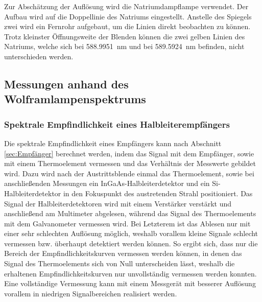 \documentclass[a4paper,twoside,final]{article}
\begin{document}


Zur Abschätzung der Auflösung wird die Natriumdampflampe verwendet. Der Aufbau wird auf die Doppellinie des Natriums eingestellt. Anstelle des Spiegels zwei wird ein Fernrohr aufgebaut, um die Linien direkt beobachten zu können. Trotz kleinster Öffnungsweite der Blenden können die zwei gelben Linien des Natriums, welche sich bei \SI{588.9951}{\nano\meter} und bei \SI{589.5924}{\nano\meter} befinden, nicht unterschieden werden.

\subsection{Messungen anhand des Wolframlampenspektrums}
\subsubsection{Spektrale Empfindlichkeit eines Halbleiterempfängers}
Die spektrale Empfindlichkeit eines Empfängers kann nach Abschnitt \ref{sec:Empfänger} berechnet werden, indem das Signal mit dem Empfänger, sowie mit einem Thermoelement vermessen  und das Verhältnis der Messwerte gebildet wird. Dazu wird nach der Austrittsblende einmal das Thermoelement, sowie bei anschließenden Messungen ein InGaAs-Halbleiterdetektor und ein Si-Halbleiterdetektor in den Fokuspunkt des austretenden Strahl positioniert. Das Signal der Halbleiterdetektoren wird mit einem Verstärker verstärkt und anschließend am Multimeter abgelesen, während das Signal des Thermoelements mit dem Galvanometer vermessen wird. Bei Letzterem ist das Ablesen nur mit einer sehr schlechten Auflösung möglich, weshalb vorallem kleine Signale schlecht vermessen bzw. überhaupt detektiert werden können. So ergibt sich, dass nur die Bereich der Empfindlichkeitskurven vermessen werden können, in denen das Signal des Thermoelements sich von Null unterscheiden lässt, weshalb die erhaltenen Empfindlichkeitskurven nur unvollständig vermessen werden konnten. Eine vollständige Vermessung kann mit einem Messgerät mit besserer Auflösung vorallem in niedrigen Signalbereichen realisiert werden.




\end{document}
